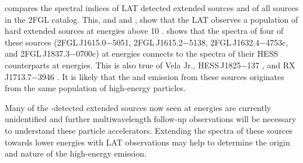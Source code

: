  compares the spectral indices of LAT
detected extended sources and of all sources in the 2FGL catalog. This,
and  and ,
show that the LAT observes a population of hard extended sources at
energies above 10 \gev.   shows that the spectra of
four of these sources (2FGL\,J1615.0$-$5051, 2FGL\,J1615.2$-$5138,
2FGL\,J1632.4$-$4753c, and 2FGL\,J1837.3$-$0700c) at \gev energies
connects to the spectra of their \ac{HESS} counterparts at
\tev energies. This is also true of Vela Jr., HESS\,J1825$-$137
\citep{grondin_2011a_detection-pulsar}, and RX\,J1713.7$-$3946
\citep{abdo_2011a_observations-young}.  It is likely that the \gev and
\tev emission from these sources originates from the same population of
high-energy particles.

Many of the \tev-detected extended sources now seen at \gev energies
are currently unidentified and further multiwavelength follow-up
observations will be necessary to understand these particle accelerators.
Extending the spectra of these \tev sources towards lower energies with
LAT observations may help to determine the origin and nature of the
high-energy emission.
